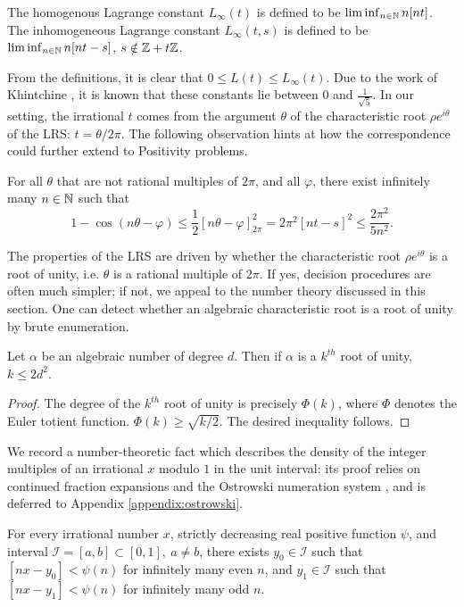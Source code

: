 \begin{definition}
\label{def:Linfty}
The homogenous Lagrange constant $L_\infty(t)$ is defined to be $\liminf_{n \in \mathbb{N}} n[nt]$. The inhomogeneous Lagrange constant $L_\infty(t, s)$ is defined to be\\ $\liminf_{n \in \mathbb{N}} n[nt - s]$, $s \notin \mathbb{Z} + t\mathbb{Z}$.
\end{definition} 

From the definitions, it is clear that $0 \le L(t) \le L_\infty(t)$. Due to the work of Khintchine \cite{khintchine}, it is known that these constants lie between $0$ and $\frac{1}{\sqrt{5}}$. In our setting, the irrational $t$ comes from the argument $\theta$ of the characteristic root $\rho e^{i\theta}$ of the LRS: $t = \theta/2\pi$. The following observation hints at how the correspondence could further extend to Positivity problems.
\begin{lemma}
For all $\theta$ that are not rational multiples of $2\pi$, and all $\varphi$, there exist infinitely many $n\in \mathbb{N}$ such that
\begin{equation}
\label{eq:quadraticdecay}
1 - \cos(n\theta- \varphi) \le \frac{1}{2}\left[n\theta - \varphi \right]_{2\pi}^2 = 2\pi^2[nt -s]^2 \le \frac{2\pi^2}{5n^2}.
\end{equation}
\end{lemma}

The properties of the LRS are driven by whether the characteristic root $\rho e^{i\theta}$ is a root of unity, i.e. $\theta$ is a rational multiple of $2\pi$. If yes, decision procedures are often much simpler; if not, we appeal to the number theory discussed in this section. One can detect whether an algebraic characteristic root is a root of unity by brute enumeration.

\begin{lemma}
\label{lemma:rootofunity}
Let $\alpha$ be an algebraic number of degree $d$. Then if $\alpha$ is a $k^{th}$ root of unity, $k \le 2d^2$.
\end{lemma}
\begin{proof}
The degree of the $k^{th}$ root of unity is precisely $\Phi(k)$, where $\Phi$ denotes the Euler totient function. $\Phi(k) \ge \sqrt{k/2}$. The desired inequality follows.
\end{proof}

We record a number-theoretic fact which describes the density of the integer multiples of an irrational $x$ modulo $1$ in the unit interval: its proof relies on continued fraction expansions and the Ostrowski numeration system \cite{bourla2016ostrowski,berthe2022dynamics}, and is deferred to Appendix \ref{appendix:ostrowski}.
\begin{lemma}
\label{lemma:existsreal}
For every irrational number $x$, strictly decreasing real positive function $\psi$, and interval $\mathcal{I} = [a, b] \subset [0, 1], ~ a \ne b$, there exists $y_0 \in \mathcal{I}$ such that $[nx - y_0] < \psi(n)$ for infinitely many even $n$, and $y_1 \in \mathcal{I}$ such that $[nx - y_1] < \psi(n)$ for infinitely many odd $n$.
\end{lemma}

